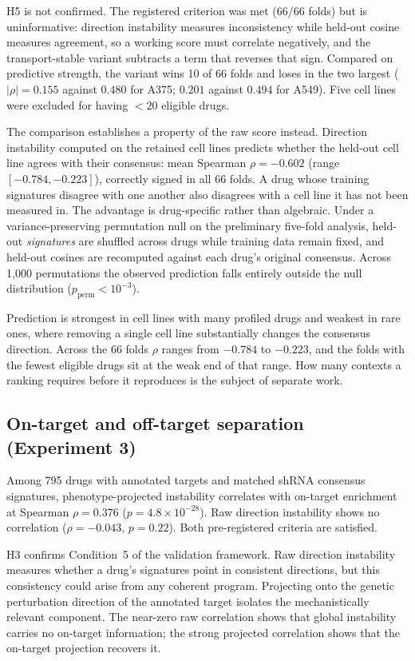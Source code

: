 \documentclass[11pt]{article}
\begin{document}
H5 is not confirmed. The registered criterion was met (66/66 folds) but
is uninformative: direction instability measures inconsistency while
held-out cosine measures agreement, so a working score must correlate
negatively, and the transport-stable variant subtracts a term that
reverses that sign. Compared on predictive strength, the variant wins 10
of 66 folds and loses in the two largest ($|\rho| = 0.155$ against
$0.480$ for A375; $0.201$ against $0.494$ for A549). Five cell lines were
excluded for having $< 20$ eligible drugs.

The comparison establishes a property of the raw score instead. Direction
instability computed on the retained cell lines predicts whether the
held-out cell line agrees with their consensus: mean Spearman
$\rho = -0.602$ (range $[-0.784, -0.223]$), correctly signed in all 66
folds. A drug whose training signatures disagree with one another also
disagrees with a cell line it has not been measured in.
The advantage is drug-specific rather than algebraic. Under a
variance-preserving permutation null on the preliminary five-fold analysis,
held-out \emph{signatures} are shuffled across drugs while training data
remain fixed, and held-out cosines are recomputed against each drug's
original consensus. Across 1{,}000 permutations the observed prediction
falls entirely outside the null distribution
($p_{\text{perm}} < 10^{-3}$).

Prediction is strongest in cell lines with many profiled drugs and weakest
in rare ones, where removing a single cell line substantially changes the
consensus direction. Across the 66 folds $\rho$ ranges from $-0.784$ to
$-0.223$, and the folds with the fewest eligible drugs sit at the weak end
of that range. How many contexts a ranking requires before it reproduces is
the subject of separate work.


\subsection{On-target and off-target separation (Experiment 3)}

Among 795 drugs with annotated targets and matched shRNA consensus signatures,
phenotype-projected instability correlates with on-target enrichment at Spearman
$\rho = 0.376$ ($p = 4.8 \times 10^{-28}$). Raw direction instability shows no correlation
($\rho = -0.043$, $p = 0.22$). Both pre-registered criteria are satisfied.

H3 confirms Condition~5 of the validation framework. Raw direction instability
measures whether a drug's signatures point in consistent directions, but
this consistency could arise from any coherent program. Projecting onto the
genetic perturbation direction of the annotated target isolates the
mechanistically relevant component. The near-zero raw correlation shows
that global instability carries no on-target information; the strong
projected correlation shows that the on-target projection recovers it.
\end{document}
